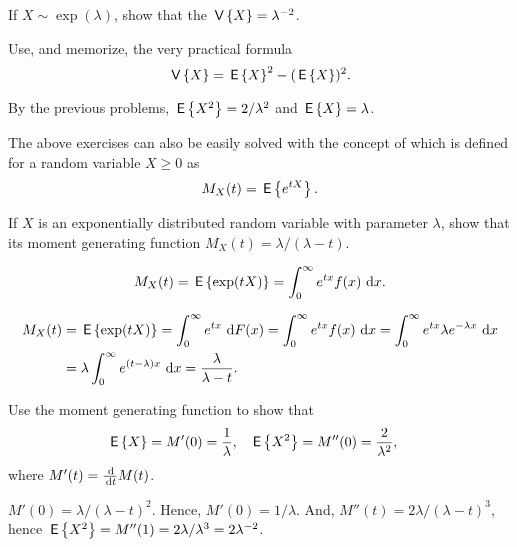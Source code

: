 \begin{exercise} 
  If $X\sim\exp(\lambda)$, show that the 
$\,\mathsf{V}\left\{X\right\} = \lambda^{-2}$.
  \begin{hint} Use, and memorize, the very practical formula
  \begin{equation*}
  \,\mathsf{V}\left\{X\right\} = \,\mathsf{E}\left\{X\right\}^2 - (\,\mathsf{E}\left\{X\right\})^2.
  \end{equation*}
  \end{hint}
  \begin{solution}
    By the previous problems, $\,\mathsf{E}\left\{X^2\right\}=2/\lambda^2$ and $\,\mathsf{E}\left\{X\right\} = \lambda$. 
  \end{solution}
\end{exercise}

The  above exercises can also be easily solved with the concept of  which is defined for a random variable $X\geq 0$ as 
\begin{equation*}
  M_X(t) = \,\mathsf{E}\left\{e^{tX}\right\}.
\end{equation*}

\begin{exercise}\label{ex:33}
 If $X$ is an exponentially distributed random variable with
    parameter $\lambda$, show that its moment generating function
   $ M_X(t) = \lambda/(\lambda-t)$.
   \begin{hint}
    \begin{equation*}
      M_X(t) = \,\mathsf{E}\left\{\exp(t X)\right\} =\int_0^\infty e^{tx} f(x) \,\,\text{d}x.
\end{equation*}
\end{hint}
    \begin{solution}
    \begin{equation*}
      \begin{split}
      M_X(t) &= \,\mathsf{E}\left\{\exp(t X)\right\} = \int_0^\infty e^{tx} \,\,\text{d}F(x) 
=\int_0^\infty e^{tx} f(x) \,\,\text{d}x 
=\int_0^\infty e^{tx} \lambda e^{-\lambda x} \,\,\text{d}x  \\
&=\lambda \int_0^\infty e^{(t-\lambda)x} \,\,\text{d}x 
=\frac{\lambda}{\lambda -t}.
      \end{split}
    \end{equation*}
    \end{solution}
  \end{exercise}

\begin{exercise}
    Use the moment generating function to show that 
    \begin{align*}
      \,\mathsf{E}\left\{X\right\} &= M'(0)=\frac1\lambda, & 
      \,\mathsf{E}\left\{X^2\right\} &= M''(0)=\frac2{\lambda^2}, 
    \end{align*}
where $M'(t) = \frac{\d}{\d t} M(t)$. 
\begin{solution}
  $M'(0)=\lambda/(\lambda-t)^2$. Hence, $M'(0)=1/\lambda$. And, $M''(t)=2\lambda/(\lambda-t)^3$, hence $\,\mathsf{E}\left\{X^2\right\}=M''(1)=2\lambda/\lambda^3=2\lambda^{-2}$. 
\end{solution}
  \end{exercise}


